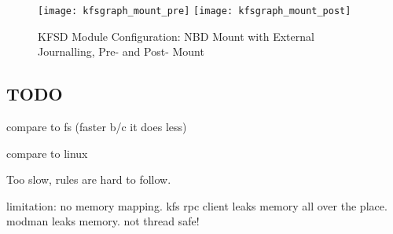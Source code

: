 \begin{figure}[htb]
\begin{center}
  \texttt{[image: kfsgraph\_mount\_pre]}
  \texttt{[image: kfsgraph\_mount\_post]}
  \caption{KFSD Module Configuration: NBD Mount with External Journalling, Pre- and Post- Mount}
  \label{fig:kfsgraph-mount}
\end{center}
\end{figure}


\subsection{TODO}

compare to fs (faster b/c it does less)

compare to linux

Too slow, rules are hard to follow.

limitation: no memory mapping. kfs rpc client leaks memory all over
the place. modman leaks memory. not thread safe!
